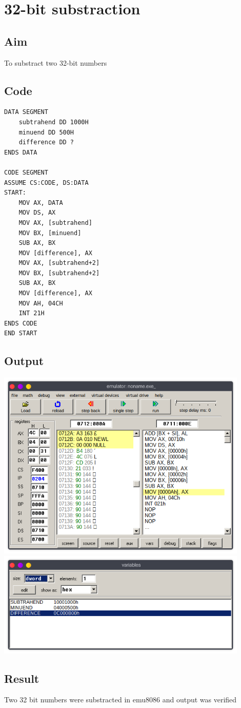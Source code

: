 \section{32-bit substraction}
\subsection{Aim}
To substract two 32-bit numbers

\subsection{Code}
\begin{lstlisting}
DATA SEGMENT
	subtrahend DD 1000H
	minuend DD 500H
	difference DD ?
ENDS DATA

CODE SEGMENT
ASSUME CS:CODE, DS:DATA
START:
	MOV AX, DATA
	MOV DS, AX
	MOV AX, [subtrahend]
	MOV BX, [minuend]
	SUB AX, BX
	MOV [difference], AX
	MOV AX, [subtrahend+2]
	MOV BX, [subtrahend+2]
	SUB AX, BX
	MOV [difference], AX
	MOV AH, 04CH
    INT 21H
ENDS CODE
END START
\end{lstlisting}

\subsection{Output}
\begin{center}
	\includegraphics[width=0.90\textwidth]{img/p4/ss1.png}
	\includegraphics[width=0.90\textwidth]{img/p4/ss2.png}
\end{center}

\subsection{Result}
Two 32 bit numbers were substracted in emu8086 and output was verified